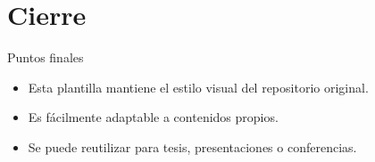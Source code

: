 \section{Cierre}

\begin{frame}{Puntos finales}
  \begin{itemize}
    \item Esta plantilla mantiene el estilo visual del repositorio original.
    \item Es fácilmente adaptable a contenidos propios.
    \item Se puede reutilizar para tesis, presentaciones o conferencias.
  \end{itemize}
\end{frame}
